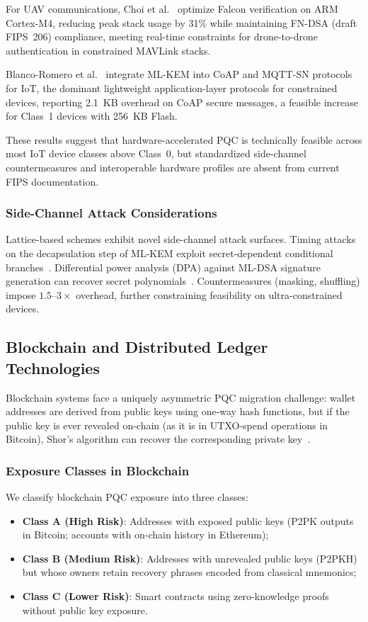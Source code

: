 \documentclass[journal]{IEEEtran}
\begin{document}
For UAV communications, Choi et al.~\cite{choi2024falcon} optimize Falcon
verification on ARM Cortex-M4, reducing peak stack usage by 31\% while
maintaining FN-DSA (draft FIPS~206) compliance, meeting real-time constraints for
drone-to-drone authentication in constrained MAVLink stacks.

Blanco-Romero et al.~\cite{blancor2024coap} integrate ML-KEM into CoAP and
MQTT-SN protocols for IoT, the dominant lightweight application-layer protocols
for constrained devices, reporting 2.1~KB overhead on CoAP secure messages, a
feasible increase for Class~1 devices with 256~KB Flash.

These results suggest that hardware-accelerated PQC is technically feasible
across most IoT device classes above Class~0, but standardized side-channel
countermeasures and interoperable hardware profiles are absent from current
FIPS documentation.

\subsubsection{Side-Channel Attack Considerations}

Lattice-based schemes exhibit novel side-channel attack surfaces. Timing attacks
on the decapsulation step of ML-KEM exploit secret-dependent conditional
branches~\cite{ravi2020masking}. Differential power analysis (DPA) against
ML-DSA signature generation can recover secret polynomials~\cite{ebrahimi2022side}.
Countermeasures (masking, shuffling) impose $1.5$--$3\times$ overhead, further
constraining feasibility on ultra-constrained devices.

\subsection{Blockchain and Distributed Ledger Technologies}
\label{sec:blockchain}

Blockchain systems face a uniquely asymmetric PQC migration challenge: wallet
addresses are derived from public keys using one-way hash functions, but if
the public key is ever revealed on-chain (as it is in UTXO-spend operations in
Bitcoin), Shor's algorithm can recover the corresponding private key~\cite{ding2022ethereum}.

\subsubsection{Exposure Classes in Blockchain}

We classify blockchain PQC exposure into three classes:
\begin{itemize}
  \item \textbf{Class A (High Risk)}: Addresses with exposed public keys
  (P2PK outputs in Bitcoin; accounts with on-chain history in Ethereum);
  \item \textbf{Class B (Medium Risk)}: Addresses with unrevealed public keys
  (P2PKH) but whose owners retain recovery phrases encoded from classical
  mnemonics;
  \item \textbf{Class C (Lower Risk)}: Smart contracts using zero-knowledge
  proofs without public key exposure.
\end{itemize}
\end{document}
